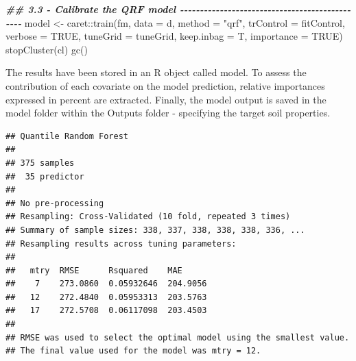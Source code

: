 \documentclass[
  10pt,
  b5paper,
  oneside]{book}
\newenvironment{Shaded}{\begin{snugshade}}{\end{snugshade}}
\newcommand{\AttributeTok}[1]{\textcolor[rgb]{0.77,0.63,0.00}{#1}}
\newcommand{\ConstantTok}[1]{\textcolor[rgb]{0.00,0.00,0.00}{#1}}
\newcommand{\DocumentationTok}[1]{\textcolor[rgb]{0.56,0.35,0.01}{\textbf{\textit{#1}}}}
\newcommand{\FunctionTok}[1]{\textcolor[rgb]{0.00,0.00,0.00}{#1}}
\newcommand{\NormalTok}[1]{#1}
\newcommand{\OtherTok}[1]{\textcolor[rgb]{0.56,0.35,0.01}{#1}}
\newcommand{\SpecialCharTok}[1]{\textcolor[rgb]{0.00,0.00,0.00}{#1}}
\newcommand{\StringTok}[1]{\textcolor[rgb]{0.31,0.60,0.02}{#1}}
\begin{document}
\begin{Shaded}
\begin{Highlighting}[]
\DocumentationTok{\#\# 3.3 {-} Calibrate the QRF model {-}{-}{-}{-}{-}{-}{-}{-}{-}{-}{-}{-}{-}{-}{-}{-}{-}{-}{-}{-}{-}{-}{-}{-}{-}{-}{-}{-}{-}{-}{-}{-}{-}{-}{-}{-}{-}{-}{-}{-}{-}{-}{-}{-}{-}{-}{-}}
\NormalTok{model }\OtherTok{\textless{}{-}}\NormalTok{ caret}\SpecialCharTok{::}\FunctionTok{train}\NormalTok{(fm,}
                      \AttributeTok{data =}\NormalTok{ d,}
                      \AttributeTok{method =} \StringTok{"qrf"}\NormalTok{,}
                      \AttributeTok{trControl =}\NormalTok{ fitControl,}
                      \AttributeTok{verbose =} \ConstantTok{TRUE}\NormalTok{,}
                      \AttributeTok{tuneGrid =}\NormalTok{ tuneGrid,}
                      \AttributeTok{keep.inbag =}\NormalTok{ T,}
                      \AttributeTok{importance =} \ConstantTok{TRUE}\NormalTok{)}
\FunctionTok{stopCluster}\NormalTok{(cl)}
\FunctionTok{gc}\NormalTok{()}
\end{Highlighting}
\end{Shaded}

The results have been stored in an R object called model. To assess the contribution of each covariate on the model prediction, relative importances expressed in percent are extracted. Finally, the model output is saved in the model folder within the Outputs folder - specifying the target soil properties.

\begin{Shaded}
\end{Shaded}

\begin{verbatim}
## Quantile Random Forest 
## 
## 375 samples
##  35 predictor
## 
## No pre-processing
## Resampling: Cross-Validated (10 fold, repeated 3 times) 
## Summary of sample sizes: 338, 337, 338, 338, 338, 336, ... 
## Resampling results across tuning parameters:
## 
##   mtry  RMSE      Rsquared    MAE     
##    7    273.0860  0.05932646  204.9056
##   12    272.4840  0.05953313  203.5763
##   17    272.5708  0.06117098  203.4503
## 
## RMSE was used to select the optimal model using the smallest value.
## The final value used for the model was mtry = 12.
\end{verbatim}
\end{document}
